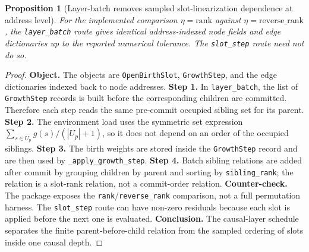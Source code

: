 \documentclass[11pt]{article}
\newtheorem{proposition}[definition]{Proposition}
\theoremstyle{remark}
\newcommand{\code}[1]{\texttt{#1}}
\numberwithin{equation}{section}
\begin{document}
\begin{proposition}[Layer-batch removes sampled slot-linearization dependence at address level]
For the implemented comparison \(\eta=\mathrm{rank}\) against \(\eta=\mathrm{reverse\_rank}\), the \code{layer\_\allowbreak{}batch} route gives identical address-indexed node fields and edge dictionaries up to the reported numerical tolerance. The \code{slot\_\allowbreak{}step} route need not do so.
\end{proposition}
\begin{proof}
\textbf{Object.} The objects are \code{OpenBirthSlot}, \code{GrowthStep}, and the edge dictionaries indexed back to node addresses. \textbf{Step 1.} In \code{layer\_\allowbreak{}batch}, the list of \code{GrowthStep} records is built before the corresponding children are committed. Therefore each step reads the same pre-commit occupied sibling set for its parent. \textbf{Step 2.} The environment load uses the symmetric set expression \(\sum_{s\in U_p}g(s)/(|U_p|+1)\), so it does not depend on an order of the occupied siblings. \textbf{Step 3.} The birth weights are stored inside the \code{GrowthStep} record and are then used by \code{\_apply\_\allowbreak{}growth\_\allowbreak{}step}. \textbf{Step 4.} Batch sibling relations are added after commit by grouping children by parent and sorting by \code{sibling\_\allowbreak{}rank}; the relation is a slot-rank relation, not a commit-order relation. \textbf{Counter-check.} The package exposes the \code{rank}/\code{reverse\_\allowbreak{}rank} comparison, not a full permutation harness. The \code{slot\_\allowbreak{}step} route can have non-zero residuals because each slot is applied before the next one is evaluated. \textbf{Conclusion.} The causal-layer schedule separates the finite parent-before-child relation from the sampled ordering of slots inside one causal depth.
\end{proof}
\end{document}
